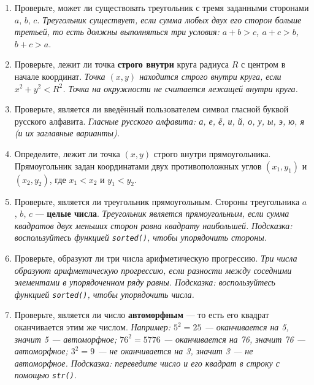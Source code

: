 \documentclass[a4paper,12pt]{article}
\theoremstyle{remark}
\begin{document}
\begin{enumerate}
    \item Проверьте, может ли существовать треугольник с тремя заданными сторонами $a$, $b$, $c$.
    \textit{Треугольник существует, если сумма любых двух его сторон больше третьей, то есть должны выполняться три условия: $a + b > c$, $a + c > b$, $b + c > a$.}

    \item Проверьте, лежит ли точка \textbf{строго внутри} круга радиуса $R$ с центром в начале координат. \textit{Точка $(x, y)$ находится строго внутри круга, если $x^2 + y^2 < R^2$. Точка на окружности не считается лежащей внутри круга.}

    \item Проверьте, является ли введённый пользователем символ гласной буквой русского алфавита.
    \textit{Гласные русского алфавита: а, е, ё, и, й, о, у, ы, э, ю, я (и их заглавные варианты).}


    \item Определите, лежит ли точка $(x, y)$ строго внутри прямоугольника. Прямоугольник задан координатами двух противоположных углов $(x_1, y_1)$ и $(x_2, y_2)$, где $x_1 < x_2$ и $y_1 < y_2$.

    \item Проверьте, является ли треугольник прямоугольным. Стороны треугольника $a$, $b$, $c$ — \textbf{целые числа}.
    \textit{Треугольник является прямоугольным, если сумма квадратов двух меньших сторон равна квадрату наибольшей. Подсказка: воспользуйтесь функцией \texttt{sorted()}, чтобы упорядочить стороны.}

    \item Проверьте, образуют ли три числа арифметическую прогрессию.
    \textit{Три числа образуют арифметическую прогрессию, если разности между соседними элементами в упорядоченном ряду равны. Подсказка: воспользуйтесь функцией \texttt{sorted()}, чтобы упорядочить числа.}

    \item Проверьте, является ли число \textbf{автоморфным} — то есть его квадрат оканчивается этим же числом.
    \textit{Например: $5^2 = 25$ — оканчивается на 5, значит 5 — автоморфное; $76^2 = 5776$ — оканчивается на 76, значит 76 — автоморфное; $3^2 = 9$ — не оканчивается на 3, значит 3 — не автоморфное.
    Подсказка: переведите число и его квадрат в строку с помощью \texttt{str()}.}


\end{enumerate}
\end{document}
